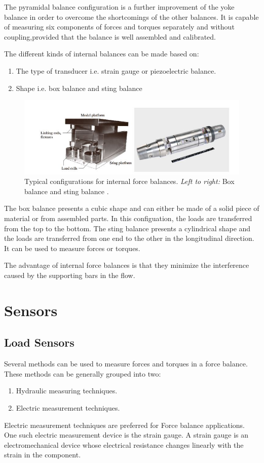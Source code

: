 The pyramidal balance configuration is a further improvement of the yoke balance in order to overcome the shortcomings of the other balances. It is capable of measuring six components of forces and
torques separately and without coupling,provided that the balance is well assembled and calibrated.

The different kinds of internal balances can be made based on:
\begin{enumerate}
\item The type of transducer i.e. strain gauge or piezoelectric balance.
\item Shape i.e. box balance and sting balance
\end{enumerate} 
\begin{center}
	\begin{figure}[!h]
	\centering
	\includegraphics[width=0.8\linewidth]{Figures/Fig7}
	\caption[Internal force balances]{Typical configurations for internal force balances. \textit{Left to right:} Box balance and sting balance \cite{ferreira2015design}.}
	\end{figure}
\end{center}
The box balance presents a cubic shape and can either be made of a solid piece of material or from assembled parts. In this configuation, the loads are transferred from the top to the bottom. The sting balance presents a cylindrical shape and the loads are transferred from one end to the other in the longitudinal direction. It can be used to measure forces or torques.

The advantage of internal force balances is that they minimize the interference caused by the supporting bars in the flow.
\section{Sensors}
\subsection{Load Sensors}
Several methods can be used to measure forces and torques in a force balance. These methods can be generally grouped into two:
\begin{enumerate}
\item Hydraulic measuring techniques.
\item Electric measurement techniques.
\end{enumerate}
Electric measurement techniques are preferred for Force balance applications. One such electric measurement device is the strain gauge. A strain gauge is an electromechanical device whose electrical resistance changes linearly with the strain in the component.

